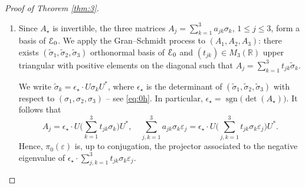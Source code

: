 \documentclass[11pt]{article}
\numberwithin{equation}{section}
\let\pazocal\EuScript
\theoremstyle{definition}
\DeclareMathOperator{\sgn}{sgn}
\DeclareMathOperator{\Tr}{Tr}
\newcommand{\EE}{\pazocal{E}}
\newcommand{\C}{\mathbb{C}}
\newcommand{\R}{\mathbb{R}}
\let\epsi\varepsilon
\let\p\partial
\newcommand{\tsigma}{{\tilde{\sigma}}}
\begin{document}
\begin{proof}[Proof of Theorem \ref{thm:3}]
\begin{enumerate}
For $\epsi \neq 0$, the matrix $\sum_{j, k=1}^3 a_{jk} \sigma_k \epsi_j$ has two opposite, distinct eigenvalues. Let $\pi_0(\epsi)$ be the projector to the negative eigenvalue. Then
\begin{align*}
\pi(\zeta_\star+\epsi) &= \pi_0(\epsi) + O(|\epsi|), & \nabla\pi(\zeta_\star+\epsi) &= \nabla\pi_0(\epsi) + O(1),
\\
\nabla\pi(\zeta_\star+\epsi) &= O(|\epsi|^{-1}), & \nabla\pi_0(\zeta_\star+\epsi) &= O(|\epsi|^{-1}).
\end{align*}
We refer to the proof of \cite[Lem.\,2.4]{D19b} for such estimates. It follows that
\begin{equation*}
	b(\zeta_\star+\epsi) = b_0(\epsi) + O(|\epsi|^{-1}), \quad \text{where} \ \ b_0(\epsi) = \Tr_{\C^N} \left( \pi_0(\epsi) \bigl[ \p_{\xi_1} \pi_0(\epsi), \p_{\xi_2} \pi_0(\epsi) \bigr]\right).
\end{equation*}
Grouping with \eqref{eq:0l}, we obtain $B_n(\zeta_\star+\epsi) = b_0(\epsi) + O(|\epsi|^{-1})$. In particular,
\begin{equation}\label{eq:0o}
\begin{split}
\int_{|\xi-\xi_\star| \leq r}\hspace*{-2mm} B_n(s_\star\pm\delta,\xi) d\xi &= \int_{|\xi-\xi_\star| \leq r}\hspace*{-2mm} b_0(\pm\delta,\xi-\xi_\star) d\xi + O\biggl(\int_{|\xi-\xi_\star| \leq r} \dfrac{1}{|\xi-\xi_\star|} d\xi\biggr)
\\
&= \int_{|\xi| \leq r} b_0(\pm\delta,\xi) d\xi + O(r).
\end{split}
\end{equation}

\item
Since $A_\star$ is invertible, the three matrices $A_j = \sum_{k=1}^3 a_{jk} \sigma_k$, $1 \leq j \leq 3$, form a basis of $\EE_0$. We apply the Gran--Schmidt process to $(A_1, A_2, A_3)$: there exists $(\tsigma_1,\tsigma_2,\tsigma_3)$ orthonormal basis of $\EE_0$ and $(t_{jk}) \in M_3(\R)$ upper triangular with positive elements on the diagonal such that $A_j = \sum_{k=1}^3 t_{jk} \tsigma_k$.

We write $\tsigma_k = \epsilon_\star \cdot U \sigma_k U^*$, where $\epsilon_\star$ is the determinant of $(\tsigma_1,\tsigma_2,\tsigma_3)$ with respect to $(\sigma_1,\sigma_2,\sigma_3)$ -- see \eqref{eq:0h}. In particular, $\epsilon_\star = \sgn\bigl( \det(A_\star)\bigr)$. It follows that
\begin{equation*}
A_j = \epsilon_\star \cdot U \biggl(\sum_{k=1}^3 t_{jk} \sigma_k\biggr) U^*, \quad \sum_{j, k=1}^3 a_{jk} \sigma_k \epsi_j = \epsilon_\star \cdot U \biggl(\sum_{j, k=1}^3 t_{jk} \sigma_k \epsi_j \biggr) U^*.
\end{equation*}
Hence, $\pi_0(\epsi)$ is, up to conjugation, the projector associated to the negative eigenvalue of $\epsilon_\star \cdot \sum_{j, k=1}^3 t_{jk} \sigma_k \epsi_j$.


\end{enumerate}
\end{proof}
\end{document}
